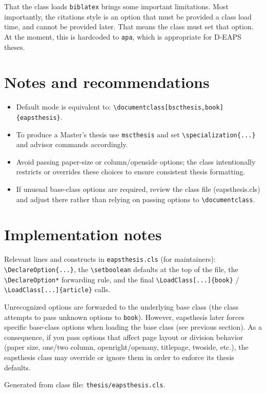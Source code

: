 \documentclass[11pt]{article}
\begin{document}
That the class loads \texttt{biblatex} brings some important limitations. Most importantly, the citations style
is an option that must be provided a class load time, and cannot be provided later. That means the class
must set that option. At the moment, this is hardcoded to \texttt{apa}, which is appropriate for 
D-EAPS theses. 

\section{Notes and recommendations}
\begin{itemize}
  \item Default mode is equivalent to: \verb|\documentclass[bscthesis,book]{eapsthesis}|.
  \item To produce a Master's thesis use \verb|mscthesis| and set \verb|\specialization{...}| and advisor commands accordingly.
  \item Avoid passing paper-size or column/openside options; the class intentionally restricts or overrides these choices to ensure consistent thesis formatting.
  \item If unusual base-class options are required, review the class file (eapsthesis.cls) and adjust there rather than relying on passing options to \verb|\documentclass|.
\end{itemize}

\section{Implementation notes}
Relevant lines and constructs in \texttt{eapsthesis.cls} (for maintainers): \verb|\DeclareOption{...}|, 
the \verb|\setboolean| defaults at the top of the file, the \verb|\DeclareOption*| forwarding rule, and 
the final \verb|\LoadClass[...]{book}| / \verb|\LoadClass[...]{article}| calls.

Unrecognized options are forwarded to the underlying base class (the class attempts to pass unknown options to 
\texttt{book}). However, eapsthesis later forces specific base-class options when loading the base class 
(see previous section). As a consequence, if you pass options that affect page layout or division behavior 
(paper size, one/two column, openright/openany, titlepage, twoside, etc.), the eapsthesis class may override or 
ignore them in order to enforce its thesis defaults.

\vspace{1em}
\noindent Generated from class file: \texttt{thesis/eapsthesis.cls}.
\end{document}
